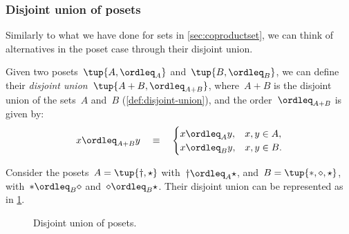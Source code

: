 \subsubsection{Disjoint union of posets}

Similarly to what we have done for sets in \cref{sec:coproductset}, we can think of alternatives in the poset case through their disjoint union.

\begin{definition}
Given two posets~$\tup{A, \ordleq_A} $ and~$\tup{B, \ordleq_B}$, we can define their \emph{disjoint union}~$\tup{ A + B, \ordleq_{A + B}}$, where~$A + B$
is the disjoint union of the sets~$A$ and~$B$ (\cref{def:disjoint-union}), and the
order~$\ordleq_{A + B}$ is given by:
\begin{equation}
    x \ordleq_{A + B} y \quad\equiv\quad
    \begin{cases}
        x \ordleq_A y, & x,y \in A, \\
        x \ordleq_B y, & x,y \in B.
    \end{cases}
\end{equation}
\end{definition}


\begin{example}
Consider the posets~$A=\tup{\dagger, \star}$ with~$\dagger \ordleq_A \star$, and~$B=\tup{\ast,\diamond,\star}$, with~$\ast \ordleq_B \diamond$ and~$\diamond \ordleq_B \star$. Their disjoint union can be represented as in \cref{fig:poset-coproduct}.

\begin{figure}[h!]
    \centering
    \caption{Disjoint union of posets. \label{fig:poset-coproduct}}
\end{figure}
\end{example}